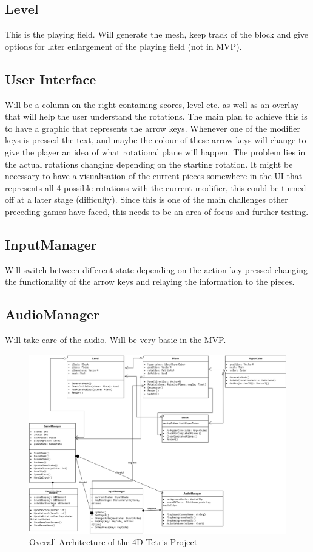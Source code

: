 \documentclass{article}
\begin{document}
\subsection{Level}
This is the playing field. Will generate the mesh, keep track of the block and give options for later enlargement of the playing field (not in MVP).
\subsection{User Interface}
Will be a column on the right containing scores, level etc. as well as an overlay that will help the user understand the rotations.
The main plan to achieve this is to have a graphic that represents the arrow keys. Whenever one of the modifier keys is pressed the text, and maybe the colour of these arrow keys will change to give the player an idea of what rotational plane will happen. The problem lies in the actual rotations changing depending on the starting rotation. It might be necessary to have a visualisation of the current pieces somewhere in the UI that represents all 4 possible rotations with the current modifier, this could be turned off at a later stage (difficulty). Since this is one of the main challenges other preceding games have faced, this needs to be an area of focus and further testing. 
\subsection{InputManager}
Will switch between different state depending on the action key pressed changing the functionality of the arrow keys and relaying the information to the pieces.
\subsection{AudioManager}
Will take care of the audio. Will be very basic in the MVP.


\begin{figure}[H]
    \centering
    \includegraphics[width=\textwidth]{classes.png}
    \caption{Overall Architecture of the 4D Tetris Project}
    \label{fig:architecture}
\end{figure}
\end{document}
